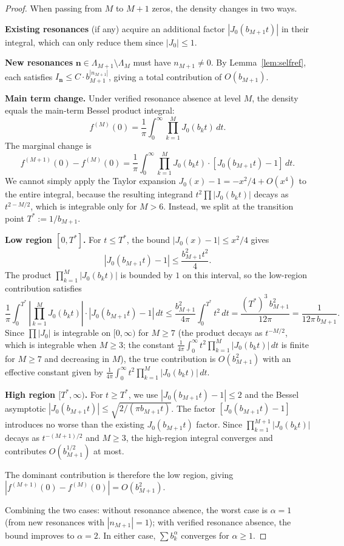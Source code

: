 \documentclass[12pt,reqno]{amsart}
\theoremstyle{plain}
\theoremstyle{definition}
\theoremstyle{remark}
\begin{document}
\begin{proof}
When passing from $M$ to $M+1$ zeros, the density changes in two ways.

\textbf{Existing resonances} (if any) acquire an additional factor $|J_0(b_{M+1} t)|$ in their integral, which can only reduce them since $|J_0| \leq 1$.

\textbf{New resonances} $\mathbf{n} \in \Lambda_{M+1} \setminus \Lambda_M$ must have $n_{M+1} \neq 0$.  By Lemma~\ref{lem:selfref}, each satisfies $I_{\mathbf{n}} \leq C \cdot b_{M+1}^{|n_{M+1}|}$, giving a total contribution of $O(b_{M+1})$.

\textbf{Main term change.}  Under verified resonance absence at level $M$, the density equals the main-term Bessel product integral:
\[
  f^{(M)}(0) = \frac{1}{\pi}\int_0^\infty \prod_{k=1}^M J_0(b_k t)\, dt.
\]
The marginal change is
\begin{equation}\label{eq:marginal}
  f^{(M+1)}(0) - f^{(M)}(0) = \frac{1}{\pi}\int_0^\infty \prod_{k=1}^M J_0(b_k t) \cdot [J_0(b_{M+1} t) - 1]\, dt.
\end{equation}
We cannot simply apply the Taylor expansion $J_0(x) - 1 = -x^2/4 + O(x^4)$ to the entire integral, because the resulting integrand $t^2\prod|J_0(b_k t)|$ decays as $t^{2-M/2}$, which is integrable only for $M > 6$.  Instead, we split at the transition point $T^* := 1/b_{M+1}$.

\textbf{Low region $[0, T^*]$.}  For $t \leq T^*$, the bound $|J_0(x) - 1| \leq x^2/4$ gives
\[
  |J_0(b_{M+1} t) - 1| \leq \frac{b_{M+1}^2 t^2}{4}.
\]
The product $\prod_{k=1}^M |J_0(b_k t)|$ is bounded by $1$ on this interval, so the low-region contribution satisfies
\[
  \frac{1}{\pi}\int_0^{T^*} \left|\prod_{k=1}^M J_0(b_k t)\right| \cdot |J_0(b_{M+1} t) - 1|\, dt \leq \frac{b_{M+1}^2}{4\pi}\int_0^{T^*} t^2\, dt = \frac{(T^*)^3\, b_{M+1}^2}{12\pi} = \frac{1}{12\pi\, b_{M+1}}.
\]
Since $\prod|J_0|$ is integrable on $[0, \infty)$ for $M \geq 7$ (the product decays as $t^{-M/2}$, which is integrable when $M \geq 3$; the constant $\frac{1}{4\pi}\int_0^\infty t^2 \prod_{k=1}^M |J_0(b_k t)|\, dt$ is finite for $M \geq 7$ and decreasing in $M$), the true contribution is $O(b_{M+1}^2)$ with an effective constant given by $\frac{1}{4\pi}\int_0^\infty t^2 \prod_{k=1}^M |J_0(b_k t)|\, dt$.

\textbf{High region $[T^*, \infty)$.}  For $t \geq T^*$, we use $|J_0(b_{M+1} t) - 1| \leq 2$ and the Bessel asymptotic $|J_0(b_{M+1} t)| \leq \sqrt{2/(\pi b_{M+1} t)}$.  The factor $[J_0(b_{M+1} t) - 1]$ introduces no worse than the existing $J_0(b_{M+1} t)$ factor.  Since $\prod_{k=1}^{M+1} |J_0(b_k t)|$ decays as $t^{-(M+1)/2}$ and $M \geq 3$, the high-region integral converges and contributes $O(b_{M+1}^{1/2})$ at most.

The dominant contribution is therefore the low region, giving $|f^{(M+1)}(0) - f^{(M)}(0)| = O(b_{M+1}^2)$.

Combining the two cases: without resonance absence, the worst case is $\alpha = 1$ (from new resonances with $|n_{M+1}| = 1$); with verified resonance absence, the bound improves to $\alpha = 2$.  In either case, $\sum b_k^\alpha$ converges for $\alpha \geq 1$.
\end{proof}
\end{document}
